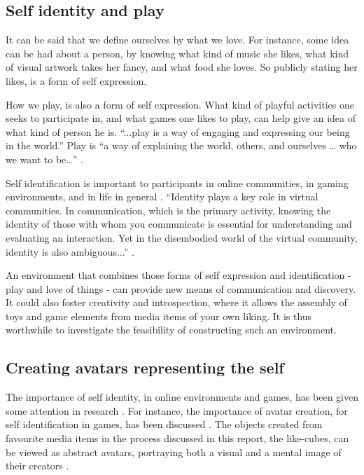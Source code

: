 \documentclass[]{article}
\begin{document}
\subsection{Self identity and play}

It can be said that we define ourselves by what we love.  For instance, some idea can be had about a person, by knowing what kind of music she likes, what kind of visual artwork takes her fancy, and what food she loves.  So publicly stating her likes, is a form of self expression.

How we play, is also a form of self expression.  What kind of playful activities one seeks to participate in, and what games one likes to play, can help give an idea of what kind of person he is.  “...play is a way of engaging and expressing our being in the world.”  Play is “a way of explaining the world, others, and ourselves … who we want to be…” \cite{sicart2014play}.

Self identification is important to participants in online communities, in gaming environments, and in life in general \cite{marwick2005selling}.  “Identity plays a key role in virtual communities. In communication, which is the primary activity, knowing the identity of those with whom you communicate is essential for understanding and evaluating an interaction.  Yet in the disembodied world of the virtual community, identity is also ambiguous...” \cite{kollock2002communities}.

An environment that combines those forms of self expression and identification - play and love of things - can provide new means of communication and discovery.  It could also foster creativity and introspection, where it allows the assembly of toys and game elements from media items of your own liking.  It is thus worthwhile to investigate the feasibility of constructing such an environment.


\subsection{Creating avatars representing the self}

The importance of self identity, in online environments and games, has been given some attention in research \cite{jones1997virtual,zhao2008identity,slater2002social,kollock2002communities,marwick2005selling,vitak2008facebook}.  For instance, the importance of avatar creation, for self identification in games, has been discussed \cite{waggoner2009my,trepte2010avatar}.  The objects created from favourite media items in the process discussed in this report, the like-cubes, can be viewed as abstract avatars, portraying both a visual and a mental image of their creators \cite{trepte2010avatar}.
\end{document}
